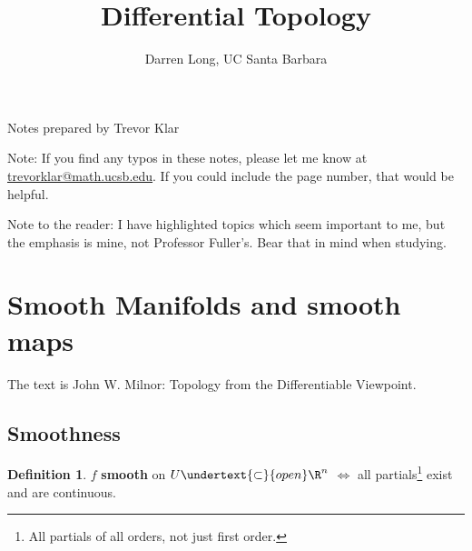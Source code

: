 \documentclass[a5paper]{article}
\title{Differential Topology}
\author{Darren Long, UC Santa Barbara}
\theoremstyle{definition}%
\newtheorem*{definition*}{Definition}
\numberwithin{exercise}{section}
\theoremstyle{remark}%
\renewcommand{\emph}{\textbf}
\begin{document}
\maketitle

\begin{center}
Notes prepared by Trevor Klar
\end{center}

\tableofcontents



\begin{highlight}
Note: If you find any typos in these notes, please let me know at \\ \href{mailto:trevorklar@math.ucsb.edu}{trevorklar@math.ucsb.edu}. If you could include the page number, that would be helpful. 

Note to the reader: I have highlighted topics which seem important to me, but the emphasis is mine, not Professor Fuller's. Bear that in mind when studying. 
\end{highlight}

\section{Smooth Manifolds and smooth maps}

The text is John W. Milnor: Topology from the Differentiable Viewpoint. 

\subsection{Smoothness}

\begin{definition*}
$f$ \emph{smooth} on $U\undertext{\subset}{open} \R^n$ $\iff$ all partials\footnote{All partials of all orders, not just first order.} exist and are continuous. 
\end{definition*}
\end{document}
